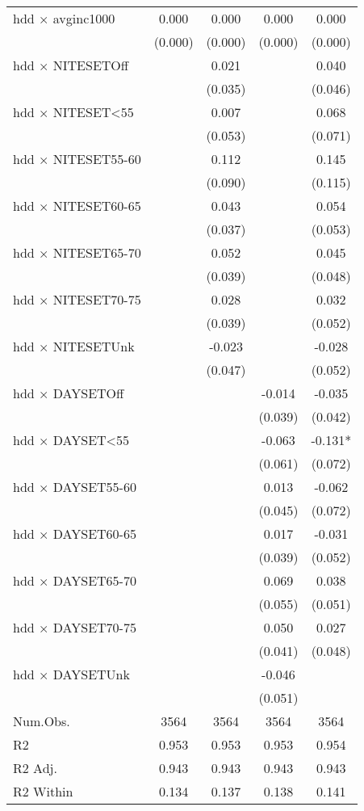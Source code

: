 \documentclass[
]{article}
\begin{document}
\begin{table}
{\begin{tabular}[t]{lcccc}
hdd × avginc1000 & 0.000 & 0.000 & 0.000 & 0.000\\
 & (0.000) & (0.000) & (0.000) & (0.000)\\
hdd × NITESETOff &  & 0.021 &  & 0.040\\
 &  & (0.035) &  & (0.046)\\
hdd × NITESET<55 &  & 0.007 &  & 0.068\\
 &  & (0.053) &  & (0.071)\\
hdd × NITESET55-60 &  & 0.112 &  & 0.145\\
 &  & (0.090) &  & (0.115)\\
hdd × NITESET60-65 &  & 0.043 &  & 0.054\\
 &  & (0.037) &  & (0.053)\\
hdd × NITESET65-70 &  & 0.052 &  & 0.045\\
 &  & (0.039) &  & (0.048)\\
hdd × NITESET70-75 &  & 0.028 &  & 0.032\\
 &  & (0.039) &  & (0.052)\\
hdd × NITESETUnk &  & -0.023 &  & -0.028\\
 &  & (0.047) &  & (0.052)\\
hdd × DAYSETOff &  &  & -0.014 & -0.035\\
 &  &  & (0.039) & (0.042)\\
hdd × DAYSET<55 &  &  & -0.063 & -0.131*\\
 &  &  & (0.061) & (0.072)\\
hdd × DAYSET55-60 &  &  & 0.013 & -0.062\\
 &  &  & (0.045) & (0.072)\\
hdd × DAYSET60-65 &  &  & 0.017 & -0.031\\
 &  &  & (0.039) & (0.052)\\
hdd × DAYSET65-70 &  &  & 0.069 & 0.038\\
 &  &  & (0.055) & (0.051)\\
hdd × DAYSET70-75 &  &  & 0.050 & 0.027\\
 &  &  & (0.041) & (0.048)\\
hdd × DAYSETUnk &  &  & -0.046 & \\
 &  &  & (0.051) & \\
\midrule
Num.Obs. & 3564 & 3564 & 3564 & 3564\\
R2 & 0.953 & 0.953 & 0.953 & 0.954\\
R2 Adj. & 0.943 & 0.943 & 0.943 & 0.943\\
R2 Within & 0.134 & 0.137 & 0.138 & 0.141\\

\end{tabular}}
\end{table}
\end{document}
